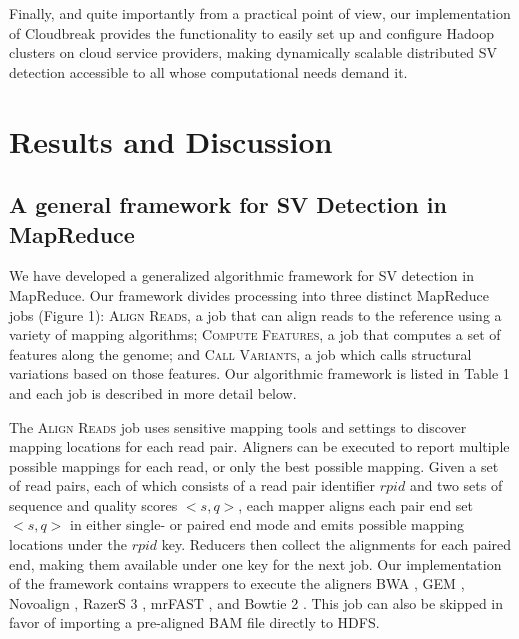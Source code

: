\documentclass[10pt]{bmc_article}
\newenvironment{bmcformat}{\fussy\setboolean{publ}{true}}{\fussy}
\begin{document}
\begin{bmcformat}
Finally, and quite importantly from a practical point of view, our implementation of Cloudbreak provides the functionality to easily set up and configure Hadoop clusters on cloud service providers, making dynamically scalable distributed SV detection accessible to all whose computational needs demand it.
 
\section*{Results and Discussion}

\subsection*{A general framework for SV Detection in MapReduce}

We have developed a generalized algorithmic framework for SV detection in MapReduce. Our framework divides processing into three distinct MapReduce jobs (Figure 1): \textsc{Align Reads}, a job that can align reads to the reference using a variety of mapping algorithms; \textsc{Compute Features}, a job that computes a set of features along the genome; and \textsc{Call Variants}, a job which calls structural variations based on those features. Our algorithmic framework is listed in Table 1 and each job is described in more detail below.

The \textsc{Align Reads} job uses sensitive mapping tools and settings to discover mapping locations for each read pair. Aligners can be executed to report multiple possible mappings for each read, or only the best possible mapping. Given a set of read pairs, each of which consists of a read pair identifier $rpid$ and two sets of sequence and quality scores $<s,q>$, each mapper aligns each pair end set $<s,q>$ in either single- or paired end mode and emits possible mapping locations under the $rpid$ key. Reducers then collect the alignments for each paired end, making them available under one key for the next job. Our implementation of the framework contains wrappers to execute the aligners BWA \cite{Li:2009p836}, GEM \cite{MarcoSola:2012hm}, Novoalign \cite{novoalign}, RazerS 3 \cite{Weese:2012by}, mrFAST \cite{Alkan:2009cr}, and Bowtie 2 \cite{Langmead:2012jh}. This job can also be skipped in favor of importing a pre-aligned BAM file directly to HDFS.


\end{bmcformat}
\end{document}

